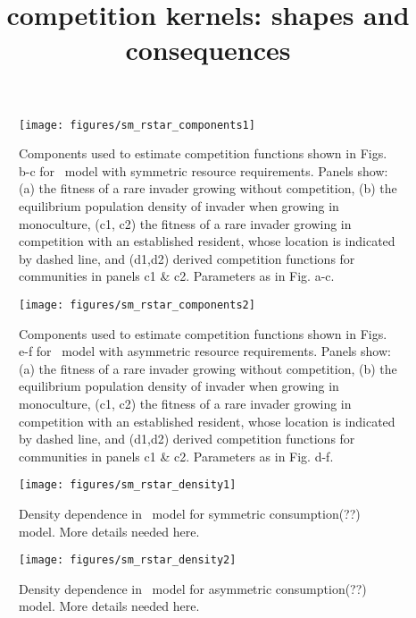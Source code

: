 \documentclass[10pt,twoside]{article}
\title{competition kernels: shapes and consequences}
\date{}
\begin{document}
\maketitle

\setcounter{secnumdepth}{1}

\newpage

\begin{figure}[h]
 \centering
 \texttt{[image: figures/sm\_rstar\_components1]}
 \caption{Components used to estimate competition functions shown in Figs.
 {\figRstar}b-c for \Rstar\ model with symmetric resource requirements.
  Panels show: (a) the fitness of a rare invader growing without competition,
  (b) the equilibrium population density of invader when growing in monoculture,
  (c1, c2) the fitness of a rare invader growing in competition with an established
  resident, whose location is indicated by dashed line, and (d1,d2) derived competition
  functions for communities in panels  c1 \& c2. Parameters as in Fig.
  {\figRstar}a-c.}
  \label{fig:sm_rstar_components1}
\end{figure}

\newpage

\begin{figure}[h]
 \centering
 \texttt{[image: figures/sm\_rstar\_components2]}
 \caption{Components used to estimate competition functions shown in Figs.
 {\figRstar}e-f for \Rstar\ model with asymmetric resource requirements.
  Panels show: (a) the fitness of a rare invader growing without competition,
  (b) the equilibrium population density of invader when growing in monoculture,
  (c1, c2) the fitness of a rare invader growing in competition with an established
  resident, whose location is indicated by dashed line, and (d1,d2) derived competition
  functions for communities in panels c1 \& c2. Parameters as in Fig.
  {\figRstar}d-f.}
  \label{fig:sm_rstar_components2}
\end{figure}

\newpage

\begin{figure}[h]
  \centering
  \texttt{[image: figures/sm\_rstar\_density1]}
  \caption{Density dependence in \Rstar\ model for symmetric consumption(??) model. More details needed here.}
  \label{fig:rstar_density_dependence1}
\end{figure}

\newpage

\begin{figure}[h]
  \centering
  \texttt{[image: figures/sm\_rstar\_density2]}
  \caption{Density dependence in \Rstar\ model for asymmetric consumption(??) model. More details needed here.}
  \label{fig:rstar_density_dependence2}
\end{figure}
\end{document}
